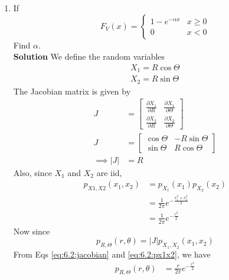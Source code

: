 \documentclass[journal, 12pt, twocolumn]{IEEEtran}
\begin{document}
\begin{enumerate}[label=\arabic{section}.\arabic*]
    \item
        If
        \begin{equation}
            F_V(x) = \begin{cases}
                1 - e^{- \alpha x} & x \geq 0 \\
                0 & x < 0
            \end{cases}
        \end{equation}
        Find $\alpha$.
        \\
        \textbf{Solution} We define the random variables
        \begin{align}
            X_1 = R \cos \Theta \\
            X_2 = R \sin \Theta
        \end{align}
        The Jacobian matrix is given by
        \begin{align}
            J &= \begin{bmatrix}
                \frac{\partial X_1}{\partial R} & \frac{\partial X_1}{\partial \Theta} \\
                \frac{\partial X_2}{\partial R} & \frac{\partial X_2}{\partial \Theta}
            \end{bmatrix} \\
            J &= \begin{bmatrix}
                \cos \Theta & -R \sin \Theta \\
                \sin \Theta & R \cos \Theta
            \end{bmatrix} \\
            \implies |J| &= R \label{eq:6.2:jacobian}
        \end{align}
        Also, since $X_1$ and $X_2$ are iid,
        \begin{align}
            p_{X1,X2}(x_1, x_2) &= p_{X_1}(x_1) p_{X_2}(x_2) \\
            &= \frac{1}{2 \pi}e^{-\frac{x_1^2 + x_2^2}{2}} \\
            &= \frac{1}{2 \pi}e^{-\frac{r^2}{2}} \label{eq:6.2:px1x2}
        \end{align}
        Now since
        \begin{equation}
            p_{R, \Theta}(r, \theta) = |J| p_{X_1, X_2}(x_1, x_2)
        \end{equation}
        From Eqs \eqref{eq:6.2:jacobian} and \eqref{eq:6.2:px1x2}, we have
        \begin{align}
            p_{R, \Theta}(r, \theta) &= \frac{r}{2 \pi}e^{-\frac{r^2}{2}} \\

\end{align}
\end{enumerate}
\end{document}
